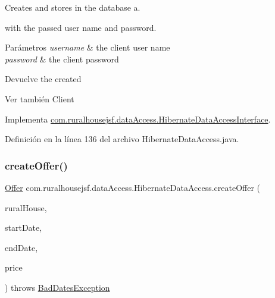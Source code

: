 Creates and stores in the database a. 


\begin{DoxyCode}{0}
\end{DoxyCode}
 with the passed user name and password.


\begin{DoxyParams}{Parámetros}
{\em username} & the client user name \\
\hline
{\em password} & the client password\\
\hline
\end{DoxyParams}
\begin{DoxyReturn}{Devuelve}
the created
\begin{DoxyCode}{0}
\end{DoxyCode}

\end{DoxyReturn}
\begin{DoxySeeAlso}{Ver también}
Client 
\end{DoxySeeAlso}


Implementa \mbox{\hyperlink{a00148_a4671ad8ff75ef8a9195974dbdcd95e7f}{com.\+ruralhousejsf.\+data\+Access.\+Hibernate\+Data\+Access\+Interface}}.



Definición en la línea 136 del archivo Hibernate\+Data\+Access.\+java.

\mbox{\label{a00144_a332f591a06df13d36814ff215008987b}} 
\subsubsection{\texorpdfstring{createOffer()}{createOffer()}\hspace{0.1cm}{\footnotesize\ttfamily [1/2]}}
{\footnotesize\ttfamily \mbox{\hyperlink{a00184}{Offer}} com.\+ruralhousejsf.\+data\+Access.\+Hibernate\+Data\+Access.\+create\+Offer (\begin{DoxyParamCaption}\item[{\mbox{\hyperlink{a00188}{Rural\+House}}}]{rural\+House,  }\item[{Local\+Date}]{start\+Date,  }\item[{Local\+Date}]{end\+Date,  }\item[{double}]{price }\end{DoxyParamCaption}) throws \mbox{\hyperlink{a00208}{Bad\+Dates\+Exception}}}



